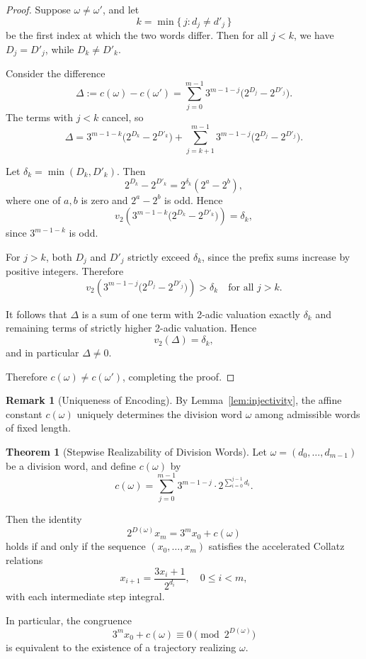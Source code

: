 \documentclass[12pt, oneside]{article}   	%
\numberwithin{equation}{section}          %
\theoremstyle{definition}
\newtheorem{theorem}{Theorem}
\newtheorem*{remark}{Remark}
\begin{document}
\begin{proof}
Suppose $\omega \ne \omega'$, and let
\[
k = \min\{\, j : d_j \ne d'_j \,\}
\]
be the first index at which the two words differ. Then for all $j < k$,
we have $D_j = D'_j$, while $D_k \ne D'_k$.

Consider the difference
\[
\Delta := c(\omega) - c(\omega')
=
\sum_{j=0}^{m-1}
3^{m-1-j}\bigl(2^{D_j} - 2^{D'_j}\bigr).
\]
The terms with $j<k$ cancel, so
\[
\Delta
=
3^{m-1-k}\bigl(2^{D_k} - 2^{D'_k}\bigr)
+
\sum_{j=k+1}^{m-1}
3^{m-1-j}\bigl(2^{D_j} - 2^{D'_j}\bigr).
\]

Let $\delta_k = \min(D_k, D'_k)$. Then
\[
2^{D_k} - 2^{D'_k}
=
2^{\delta_k}(2^a - 2^b),
\]
where one of $a,b$ is zero and $2^a - 2^b$ is odd. Hence
\[
v_2\!\left(3^{m-1-k}\bigl(2^{D_k} - 2^{D'_k}\bigr)\right)
=
\delta_k,
\]
since $3^{m-1-k}$ is odd.

For $j>k$, both $D_j$ and $D'_j$ strictly exceed $\delta_k$, since the
prefix sums increase by positive integers. Therefore
\[
v_2\!\left(3^{m-1-j}\bigl(2^{D_j} - 2^{D'_j}\bigr)\right)
>
\delta_k
\quad \text{for all } j>k.
\]

It follows that $\Delta$ is a sum of one term with 2-adic valuation
exactly $\delta_k$ and remaining terms of strictly higher 2-adic
valuation. Hence
\[
v_2(\Delta) = \delta_k,
\]
and in particular $\Delta \ne 0$.

Therefore $c(\omega) \ne c(\omega')$, completing the proof.
\end{proof}

\begin{remark}[Uniqueness of Encoding]
By Lemma~\ref{lem:injectivity}, the affine constant $c(\omega)$ uniquely
determines the division word $\omega$ among admissible words of fixed length.
\end{remark}

\begin{theorem}[Stepwise Realizability of Division Words]
\label{thm:stepwise-realizability}
Let $\omega = (d_0,\dots,d_{m-1})$ be a division word, and define $c(\omega)$ by
\[
c(\omega)
=
\sum_{j=0}^{m-1}
3^{m-1-j}\cdot 2^{\sum_{i=0}^{j-1} d_i}.
\]

Then the identity
\[
2^{D(\omega)} x_m = 3^m x_0 + c(\omega)
\]
holds if and only if the sequence $(x_0,\dots,x_m)$ satisfies the accelerated
Collatz relations
\[
x_{i+1} = \frac{3x_i+1}{2^{d_i}}, \quad 0 \le i < m,
\]
with each intermediate step integral.

In particular, the congruence
\[
3^m x_0 + c(\omega) \equiv 0 \pmod{2^{D(\omega)}}
\]
is equivalent to the existence of a trajectory realizing $\omega$.
\end{theorem}
\end{document}
